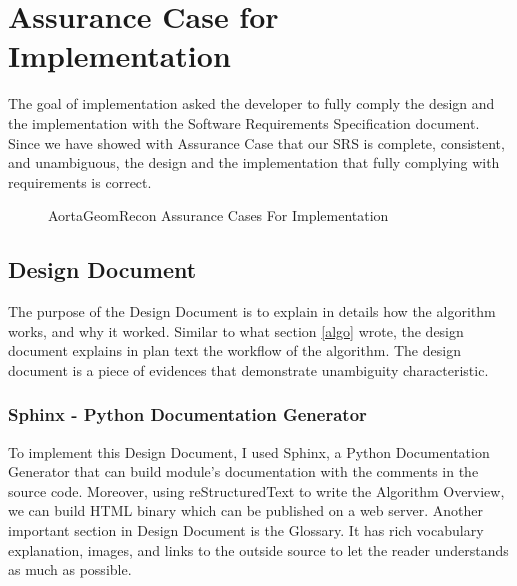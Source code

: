 \section{Assurance Case for Implementation}
The goal of implementation asked the developer to fully comply the design and the implementation with the Software Requirements Specification document. Since we have showed with Assurance Case that our SRS is complete, consistent, and unambiguous, the design and the implementation that fully complying with requirements is correct.

\begin{figure}[H]
    \centering
    \caption[AortaGeomRecon Assurance Cases For Implementation]{AortaGeomRecon Assurance Cases For Implementation}
    \label{fig_agr_ac_gi}
\end{figure}

\subsection{Design Document}
The purpose of the Design Document \cite{DD} is to explain in details how the algorithm works, and why it worked. Similar to what section \ref{algo} wrote, the design document explains in plan text the workflow of the algorithm. The design document is a piece of evidences that demonstrate unambiguity characteristic.

\subsubsection{Sphinx - Python Documentation Generator}
To implement this Design Document, I used Sphinx, a Python Documentation Generator that can build module's documentation with the comments in the source code. Moreover, using reStructuredText to write the Algorithm Overview, we can build HTML binary which can be published on a web server. Another important section in Design Document is the Glossary. It has rich vocabulary explanation, images, and links to the outside source to let the reader understands as much as possible.

